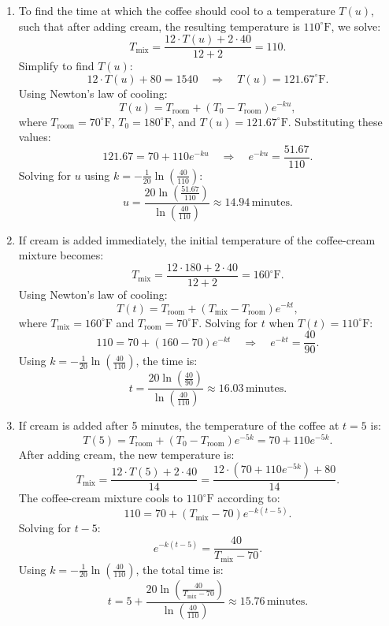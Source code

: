 \documentclass[12pt]{article}
\begin{document}
\begin{enumerate}
\begin{enumerate}
    \item 
    To find the time at which the coffee should cool to a temperature \(T(u)\), such that after adding cream, the resulting temperature is \(110^\circ \text{F}\), we solve:
    \[
    T_{\text{mix}} = \frac{12 \cdot T(u) + 2 \cdot 40}{12 + 2} = 110.
    \]
    Simplify to find \(T(u)\):
    \[
    12 \cdot T(u) + 80 = 1540 \quad \Rightarrow \quad T(u) = 121.67^\circ \text{F}.
    \]
    Using Newton's law of cooling:
    \[
    T(u) = T_{\text{room}} + (T_0 - T_{\text{room}})e^{-ku},
    \]
    where \(T_{\text{room}} = 70^\circ \text{F}\), \(T_0 = 180^\circ \text{F}\), and \(T(u) = 121.67^\circ \text{F}\). Substituting these values:
    \[
    121.67 = 70 + 110e^{-ku} \quad \Rightarrow \quad e^{-ku} = \frac{51.67}{110}.
    \]
    Solving for \(u\) using \(k = -\frac{1}{20} \ln\left(\frac{40}{110}\right)\):
    \[
    u = \frac{20 \ln\left(\frac{51.67}{110}\right)}{\ln\left(\frac{40}{110}\right)} \approx 14.94 \, \text{minutes}.
    \]

    \item  If cream is added immediately, the initial temperature of the coffee-cream mixture becomes:
    \[
    T_{\text{mix}} = \frac{12 \cdot 180 + 2 \cdot 40}{12 + 2} = 160^\circ \text{F}.
    \]
    Using Newton's law of cooling:
    \[
    T(t) = T_{\text{room}} + (T_{\text{mix}} - T_{\text{room}})e^{-kt},
    \]
    where \(T_{\text{mix}} = 160^\circ \text{F}\) and \(T_{\text{room}} = 70^\circ \text{F}\). Solving for \(t\) when \(T(t) = 110^\circ \text{F}\):
    \[
    110 = 70 + (160 - 70)e^{-kt} \quad \Rightarrow \quad e^{-kt} = \frac{40}{90}.
    \]
    Using \(k = -\frac{1}{20} \ln\left(\frac{40}{110}\right)\), the time is:
    \[
    t = \frac{20 \ln\left(\frac{40}{90}\right)}{\ln\left(\frac{40}{110}\right)} \approx 16.03 \, \text{minutes}.
    \]

    \item If cream is added after 5 minutes, the temperature of the coffee at \(t = 5\) is:
    \[
    T(5) = T_{\text{room}} + (T_0 - T_{\text{room}})e^{-5k} = 70 + 110e^{-5k}.
    \]
    After adding cream, the new temperature is:
    \[
    T_{\text{mix}} = \frac{12 \cdot T(5) + 2 \cdot 40}{14} = \frac{12 \cdot \left(70 + 110e^{-5k}\right) + 80}{14}.
    \]
    The coffee-cream mixture cools to \(110^\circ \text{F}\) according to:
    \[
    110 = 70 + (T_{\text{mix}} - 70)e^{-k(t - 5)}.
    \]
    Solving for \(t - 5\):
    \[
    e^{-k(t - 5)} = \frac{40}{T_{\text{mix}} - 70}.
    \]
    Using \(k = -\frac{1}{20} \ln\left(\frac{40}{110}\right)\), the total time is:
    \[
    t = 5 + \frac{20 \ln\left(\frac{40}{T_{\text{mix}} - 70}\right)}{\ln\left(\frac{40}{110}\right)} \approx 15.76 \, \text{minutes}.
    \]


\end{enumerate}
\end{enumerate}
\end{document}
